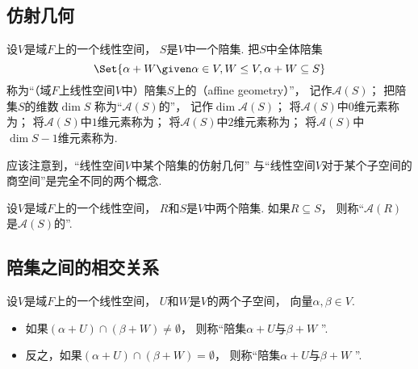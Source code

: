 \subsection{仿射几何}
\begin{definition}
设\(V\)是域\(F\)上的一个线性空间，
\(S\)是\(V\)中一个陪集.
把\(S\)中全体陪集\begin{equation*}
	\Set{
		\alpha + W
		\given
		\alpha \in V,
		W \AlgebraSubstructure V,
		\alpha + W \subseteq S
	}
\end{equation*}
称为“（域\(F\)上线性空间\(V\)中）陪集\(S\)上的（affine geometry）”，
记作\(\mathcal{A}(S)\)；
把陪集\(S\)的维数\(\dim S\)
称为“\(\mathcal{A}(S)\)的”，
记作\(\dim\mathcal{A}(S)\)；
将\(\mathcal{A}(S)\)中\(0\)维元素称为；
将\(\mathcal{A}(S)\)中\(1\)维元素称为；
将\(\mathcal{A}(S)\)中\(2\)维元素称为；
将\(\mathcal{A}(S)\)中\(\dim S-1\)维元素称为.
\end{definition}
\begin{remark}
应该注意到，“线性空间\(V\)中某个陪集的仿射几何”
与“线性空间\(V\)对于某个子空间的商空间”是完全不同的两个概念.
\end{remark}

\begin{definition}
设\(V\)是域\(F\)上的一个线性空间，
\(R\)和\(S\)是\(V\)中两个陪集.
如果\(R \subseteq S\)，
则称“\(\mathcal{A}(R)\)是\(\mathcal{A}(S)\)的”.
\end{definition}

\subsection{陪集之间的相交关系}
\begin{definition}
设\(V\)是域\(F\)上的一个线性空间，
\(U\)和\(W\)是\(V\)的两个子空间，
向量\(\alpha,\beta \in V\).
\begin{itemize}
	\item 如果\((\alpha + U) \cap (\beta + W) \neq \emptyset\)，
	则称“陪集\(\alpha + U\)与\(\beta + W\) ”.

	\item 反之，如果\((\alpha + U) \cap (\beta + W) = \emptyset\)，
	则称“陪集\(\alpha + U\)与\(\beta + W\) ”.
\end{itemize}
\end{definition}

